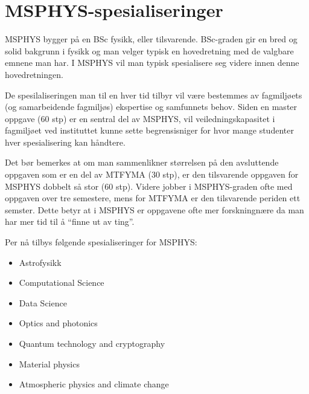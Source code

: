 \chapter{MSPHYS-spesialiseringer}
\label{c:msphys-spec}

MSPHYS bygger på en BSc fysikk, eller tilsvarende. BSc-graden gir en bred og solid bakgrunn i fysikk og man velger typisk en hovedretning med de valgbare emnene man har. I MSPHYS vil man typisk spesialisere seg videre innen denne hovedretningen.

De spesilaliseringen man til en hver tid tilbyr vil være bestemmes av fagmiljøets (og samarbeidende fagmiljøs) ekspertise og samfunnets behov. Siden en master oppgave (60 stp) er en sentral del av MSPHYS, vil veiledningskapasitet i fagmiljøet ved instituttet kunne sette begrensisniger for hvor mange studenter hver spesialisering kan håndtere.

Det bør bemerkes at om man sammenlikner størrelsen på den avsluttende oppgaven som er en del av MTFYMA (30 stp), er den tilsvarende oppgaven for MSPHYS dobbelt så stor (60 stp). Videre jobber i MSPHYS-graden ofte med oppgaven over tre semestere, mens for MTFYMA er den tilsvarende periden ett semster. Dette betyr at i MSPHYS er oppgavene ofte mer forskningnære da man har mer tid til å \enquote{finne ut av ting}.

Per nå tilbys følgende spesialiseringer for MSPHYS:

\begin{itemize}
	\item Astrofysikk
	\item Computational Science 
	\item Data Science
	\item Optics and photonics   
	\item Quantum technology and cryptography
	\item Material physics
	\item Atmospheric physics and climate change
\end{itemize}